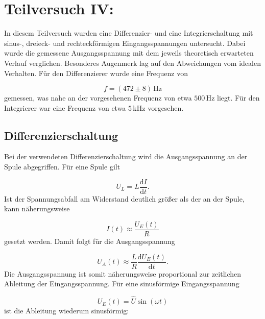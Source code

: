 \documentclass{report}
\begin{document}
\section{Teilversuch IV: }
\noindent
In diesem Teilversuch wurden eine Differenzier- und eine Integrierschaltung mit sinus-, dreieck- und rechteckförmigen Eingangsspannungen untersucht. Dabei wurde die gemessene Ausgangsspannung mit dem jeweils theoretisch erwarteten Verlauf verglichen. Besonderes Augenmerk lag auf den Abweichungen vom idealen Verhalten.
\noindent
Für den Differenzierer wurde eine Frequenz von

\begin{equation}
f=(472\pm8)\,\mathrm{Hz}
\end{equation}
\noindent
gemessen, was nahe an der vorgesehenen Frequenz von etwa $500\,\mathrm{Hz}$ liegt. Für den Integrierer war eine Frequenz von etwa $5\,\mathrm{kHz}$ vorgesehen.

\subsection{Differenzierschaltung}
\noindent
Bei der verwendeten Differenzierschaltung wird die Ausgangsspannung an der Spule abgegriffen. Für eine Spule gilt

\begin{equation}
U_L=L\frac{\mathrm{d}I}{\mathrm{d}t}.
\end{equation}
\noindent
Ist der Spannungsabfall am Widerstand deutlich größer als der an der Spule, kann näherungsweise

\begin{equation}
I(t)\approx\frac{U_E(t)}{R}
\end{equation}
\noindent
gesetzt werden. Damit folgt für die Ausgangsspannung

\begin{equation}
\boxed{
U_A(t)\approx\frac{L}{R}\frac{\mathrm{d}U_E(t)}{\mathrm{d}t}
}.
\end{equation}
\noindent
Die Ausgangsspannung ist somit näherungsweise proportional zur zeitlichen Ableitung der Eingangsspannung.
\noindent
Für eine sinusförmige Eingangsspannung

\begin{equation}
U_E(t)=\hat{U}\sin(\omega t)
\end{equation}
\noindent
ist die Ableitung wiederum sinusförmig:
\end{document}
